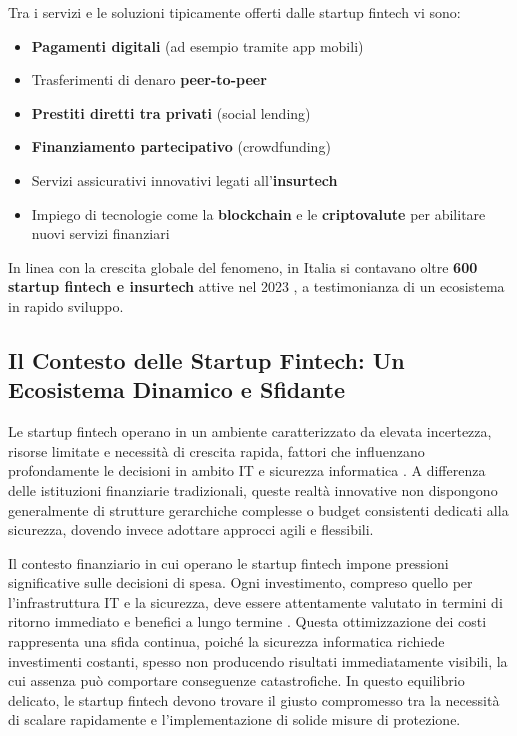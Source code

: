 \documentclass[a4paper,12pt]{report}
\begin{document}
Tra i servizi e le soluzioni tipicamente offerti dalle startup fintech vi sono:
\begin{itemize}
    \item \textbf{Pagamenti digitali} (ad esempio tramite app mobili)
    \item Trasferimenti di denaro \textbf{peer-to-peer}
    \item \textbf{Prestiti diretti tra privati} (social lending)
    \item \textbf{Finanziamento partecipativo} (crowdfunding)
    \item Servizi assicurativi innovativi legati all'\textbf{insurtech}
    \item Impiego di tecnologie come la \textbf{blockchain} e le \textbf{criptovalute} per abilitare nuovi servizi finanziari
\end{itemize}

In linea con la crescita globale del fenomeno, in Italia si contavano oltre \textbf{600 startup fintech e insurtech} attive nel 2023 \cite{fintech_numeri}, a testimonianza di un ecosistema in rapido sviluppo.
\subsection{Il Contesto delle Startup Fintech: Un Ecosistema Dinamico e Sfidante}

Le startup fintech operano in un ambiente caratterizzato da elevata incertezza, risorse limitate e necessità di crescita rapida, fattori che influenzano profondamente le decisioni in ambito IT e sicurezza informatica \cite{fintechChallenges}. A differenza delle istituzioni finanziarie tradizionali, queste realtà innovative non dispongono generalmente di strutture gerarchiche complesse o budget consistenti dedicati alla sicurezza, dovendo invece adottare approcci agili e flessibili.

Il contesto finanziario in cui operano le startup fintech impone pressioni significative sulle decisioni di spesa. Ogni investimento, compreso quello per l'infrastruttura IT e la sicurezza, deve essere attentamente valutato in termini di ritorno immediato e benefici a lungo termine \cite{fintechChallenges}. Questa ottimizzazione dei costi rappresenta una sfida continua, poiché la sicurezza informatica richiede investimenti costanti, spesso non producendo risultati immediatamente visibili, la cui assenza può comportare conseguenze catastrofiche. In questo equilibrio delicato, le startup fintech devono trovare il giusto compromesso tra la necessità di scalare rapidamente e l'implementazione di solide misure di protezione.
\end{document}
